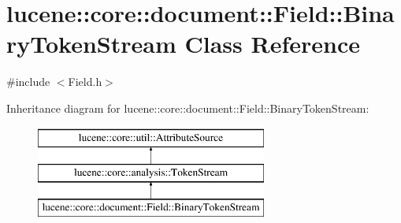 \hypertarget{classlucene_1_1core_1_1document_1_1Field_1_1BinaryTokenStream}{}\section{lucene\+:\+:core\+:\+:document\+:\+:Field\+:\+:Binary\+Token\+Stream Class Reference}
\label{classlucene_1_1core_1_1document_1_1Field_1_1BinaryTokenStream}


{\ttfamily \#include $<$Field.\+h$>$}

Inheritance diagram for lucene\+:\+:core\+:\+:document\+:\+:Field\+:\+:Binary\+Token\+Stream\+:\begin{figure}[H]
\begin{center}
\leavevmode
\includegraphics[height=3.000000cm]{classlucene_1_1core_1_1document_1_1Field_1_1BinaryTokenStream}
\end{center}
\end{figure}
